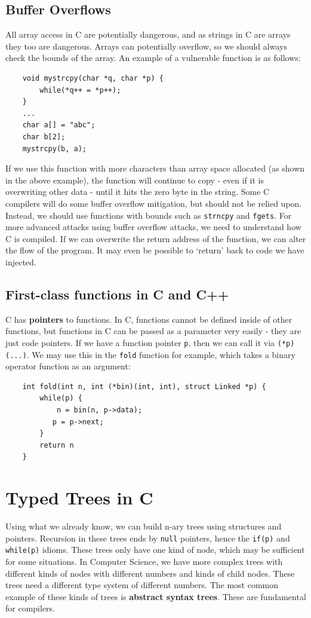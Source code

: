 \documentclass{article}
\begin{document}
	\subsection{Buffer Overflows}
	All array access in C are potentially dangerous, and as strings in C are arrays they too are dangerous. Arrays can potentially overflow, so we should always check the bounds of the array. An example of a vulnerable function is as follows:
	
	\begin{verbatim}
	void mystrcpy(char *q, char *p) {
	    while(*q++ = *p++);
	}
	...
	char a[] = "abc";
	char b[2];
	mystrcpy(b, a);
	\end{verbatim}
	
	If we use this function with more characters than array space allocated (as shown in the above example), the function will continue to copy - even if it is overwriting other data - until it hits the zero byte in the string. Some C compilers will do some buffer overflow mitigation, but should not be relied upon. Instead, we should use functions with bounds such as \texttt{strncpy} and \texttt{fgets}. For more advanced attacks using buffer overflow attacks, we need to understand how C is compiled. If we can overwrite the return address of the function, we can alter the flow of the program. It may even be possible to `return' back to code we have injected.
	
	\subsection{First-class functions in C and C++}
	C has \textbf{pointers} to functions. In C, functions cannot be defined inside of other functions, but functions in C can be passed as a parameter very easily - they are just code pointers. If we have a function pointer \texttt{p}, then we can call it via \texttt{(*p)(...)}. We may use this in the \texttt{fold} function for example, which takes a binary operator function as an argument:
	
	\begin{verbatim}
	int fold(int n, int (*bin)(int, int), struct Linked *p) {
	    while(p) {
	        n = bin(n, p->data);
    	   p = p->next;
	    }
	    return n
	}
	\end{verbatim}
	
	\section{Typed Trees in C}
	Using what we already know, we can build n-ary trees using structures and pointers. Recursion in these trees ends by \texttt{null} pointers, hence the \texttt{if(p)} and \texttt{while(p)} idioms. These trees only have one kind of node, which may be sufficient for some situations. In Computer Science, we have more complex trees with different kinds of nodes with different numbers and kinds of child nodes. These trees need a different type system of different numbers. The most common example of these kinds of trees is \textbf{abstract syntax trees}. These are fundamental for compilers.
	
\end{document}

